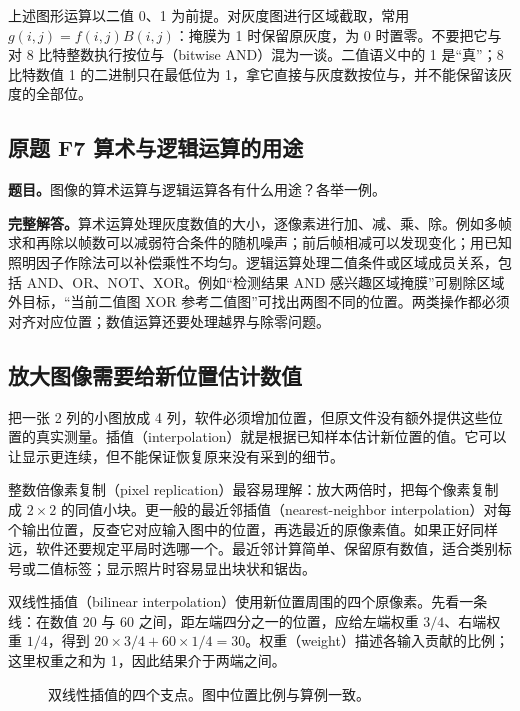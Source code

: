 上述图形运算以二值 0、1 为前提。对灰度图进行区域截取，常用 $g(i,j)=f(i,j)B(i,j)$：掩膜为 1 时保留原灰度，为 0 时置零。不要把它与对 8 比特整数执行按位与（bitwise AND）混为一谈。二值语义中的 1 是“真”；8 比特数值 1 的二进制只在最低位为 1，拿它直接与灰度数按位与，并不能保留该灰度的全部位。

\subsection*{原题 F7 算术与逻辑运算的用途}
\label{original:F7}
\textbf{题目。}图像的算术运算与逻辑运算各有什么用途？各举一例。

\textbf{完整解答。}算术运算处理灰度数值的大小，逐像素进行加、减、乘、除。例如多帧求和再除以帧数可以减弱符合条件的随机噪声；前后帧相减可以发现变化；用已知照明因子作除法可以补偿乘性不均匀。逻辑运算处理二值条件或区域成员关系，包括 AND、OR、NOT、XOR。例如“检测结果 AND 感兴趣区域掩膜”可剔除区域外目标，“当前二值图 XOR 参考二值图”可找出两图不同的位置。两类操作都必须对齐对应位置；数值运算还要处理越界与除零问题。

\subsection{放大图像需要给新位置估计数值}

把一张 2 列的小图放成 4 列，软件必须增加位置，但原文件没有额外提供这些位置的真实测量。插值（interpolation）就是根据已知样本估计新位置的值。它可以让显示更连续，但不能保证恢复原来没有采到的细节。

整数倍像素复制（pixel replication）最容易理解：放大两倍时，把每个像素复制成 $2\times2$ 的同值小块。更一般的最近邻插值（nearest-neighbor interpolation）对每个输出位置，反查它对应输入图中的位置，再选最近的原像素值。如果正好同样远，软件还要规定平局时选哪一个。最近邻计算简单、保留原有数值，适合类别标号或二值标签；显示照片时容易显出块状和锯齿。

双线性插值（bilinear interpolation）使用新位置周围的四个原像素。先看一条线：在数值 20 与 60 之间，距左端四分之一的位置，应给左端权重 $3/4$、右端权重 $1/4$，得到 $20\times3/4+60\times1/4=30$。权重（weight）描述各输入贡献的比例；这里权重之和为 1，因此结果介于两端之间。

\begin{figure}[htbp]
\centering
{}
\caption{双线性插值的四个支点。图中位置比例与算例一致。}
\end{figure}

